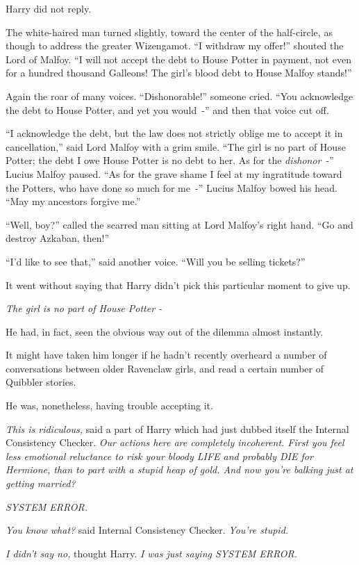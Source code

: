 Harry did not reply.

The white-haired man turned slightly, toward the center of the half-circle, as though to address the greater Wizengamot. ``I withdraw my offer!'' shouted the Lord of Malfoy. ``I will not accept the debt to House Potter in payment, not even for a hundred thousand Galleons! The girl's blood debt to House Malfoy stands!''

Again the roar of many voices. ``Dishonorable!'' someone cried. ``You acknowledge the debt to House Potter, and yet you would~-'' and then that voice cut off.

``I acknowledge the debt, but the law does not strictly oblige me to accept it in cancellation,'' said Lord Malfoy with a grim smile. ``The girl is no part of House Potter; the debt I owe House Potter is no debt to her. As for the \emph{dishonor}~-'' Lucius Malfoy paused. ``As for the grave shame I feel at my ingratitude toward the Potters, who have done so much for me~-'' Lucius Malfoy bowed his head. ``May my ancestors forgive me.''

``Well, boy?'' called the scarred man sitting at Lord Malfoy's right hand. ``Go and destroy Azkaban, then!''

``I'd like to see that,'' said another voice. ``Will you be selling tickets?''

It went without saying that Harry didn't pick this particular moment to give up.

\emph{The girl is no part of House Potter -}

He had, in fact, seen the obvious way out of the dilemma almost instantly.

It might have taken him longer if he hadn't recently overheard a number of conversations between older Ravenclaw girls, and read a certain number of Quibbler stories.

He was, nonetheless, having trouble accepting it.

\emph{This is ridiculous,} said a part of Harry which had just dubbed itself the Internal Consistency Checker. \emph{Our actions here are completely incoherent. First you feel less emotional reluctance to risk your bloody LIFE and probably DIE for Hermione, than to part with a stupid heap of gold. And now you're balking just at getting married?}

\emph{SYSTEM ERROR.}

\emph{You know what?} said Internal Consistency Checker. \emph{You're stupid.}

\emph{I didn't say no,} thought Harry. \emph{I was just saying SYSTEM ERROR.}

